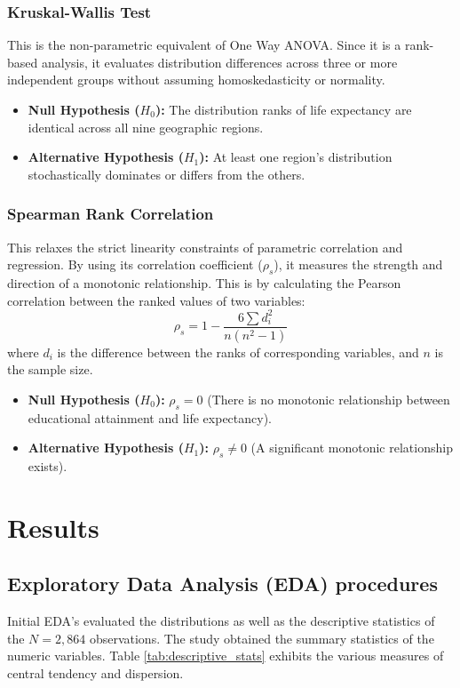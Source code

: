 \documentclass[3pt, a4paper]{article}
\begin{document}
\subsubsection{Kruskal-Wallis Test}
This is the non-parametric equivalent of One Way ANOVA. Since it is a  rank-based analysis, it evaluates distribution differences across three or more independent groups without assuming homoskedasticity or normality.
\begin{itemize}[noitemsep,topsep=0pt]
    \item \textbf{Null Hypothesis ($H_0$):} The distribution ranks of life expectancy are identical across all nine geographic regions.
    \item \textbf{Alternative Hypothesis ($H_1$):} At least one region's distribution stochastically dominates or differs from the others.
\end{itemize}

\subsubsection{Spearman Rank Correlation}
This relaxes the strict linearity constraints of parametric correlation and regression.  By using its correlation coefficient ($\rho_s$), it measures the strength and direction of a monotonic relationship. This is by calculating the Pearson correlation between the ranked values of two variables:
$$\rho_s = 1 - \frac{6 \sum d_i^2}{n(n^2 - 1)}$$
where $d_i$ is the difference between the ranks of corresponding variables, and $n$ is the sample size.
\begin{itemize}[noitemsep,topsep=0pt]
    \item \textbf{Null Hypothesis ($H_0$):} $\rho_s = 0$ (There is no monotonic relationship between educational attainment and life expectancy).
    \item \textbf{Alternative Hypothesis ($H_1$):} $\rho_s \neq 0$ (A significant monotonic relationship exists).
\end{itemize}

\section{Results}
\subsection{Exploratory Data Analysis (EDA) procedures}
Initial EDA's evaluated the distributions as well as the descriptive statistics of the $N=2,864$ observations. The study obtained the summary statistics of the numeric variables. Table \ref{tab:descriptive_stats} exhibits the various measures of central tendency and dispersion.
\end{document}
